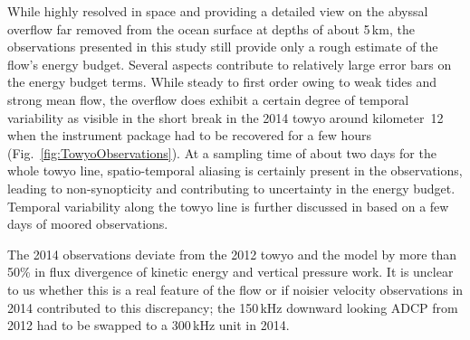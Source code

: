 \documentclass{ametsocV6.1}
\begin{document}
While highly resolved in space and providing a detailed view on the abyssal overflow far removed from the ocean surface at depths of about 5\,km, the observations presented in this study still provide only a rough estimate of the flow's energy budget.
Several aspects contribute to relatively large error bars on the energy budget terms.
While steady to first order owing to weak tides and strong mean flow, the overflow does exhibit a certain degree of temporal variability as visible in the short break in the 2014 towyo around kilometer~12 when the instrument package had to be recovered for a few hours (Fig.~\ref{fig:TowyoObservations}).
At a sampling time of about two days for the whole towyo line, spatio-temporal aliasing is certainly present in the observations, leading to non-synopticity and contributing to uncertainty in the energy budget. 
Temporal variability along the towyo line is further discussed in \citet{cusacketal19} based on a few days of moored observations.

The 2014 observations deviate from the 2012 towyo and the model by more than 50\% in flux divergence of kinetic energy and vertical pressure work.
It is unclear to us whether this is a real feature of the flow or if noisier velocity observations in 2014 contributed to this discrepancy; the 150\,kHz downward looking ADCP from 2012 had to be swapped to a 300\,kHz unit in 2014.
\end{document}
